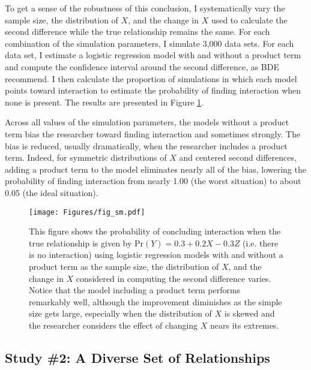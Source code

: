 \documentclass[12pt]{article}
\begin{document}
To get a sense of the robustness of this conclusion, I systematically vary the sample size, the distribution of $X$, and the change in $X$ used to calculate the second difference while the true relationship remains the same. For each combination of the simulation parameters, I simulate 3,000 data sets. For each data set, I estimate a logistic regression model with and without a product term and compute the confidence interval around the second difference, as BDE recommend. I then calculate the proportion of simulations in which each model points toward interaction to estimate the probability of finding interaction when none is present. The results are presented in Figure \ref{fig:sm}.

Across all values of the simulation parameters, the models without a product term bias the researcher toward finding interaction and sometimes strongly. The bias is reduced, usually dramatically, when the researcher includes a product term. Indeed, for symmetric distributions of $X$ and centered second differences, adding a product term to the model eliminates nearly all of the bias, lowering the probability of finding interaction
from nearly 1.00 (the worst  situation) to about 0.05 (the ideal situation).

\begin{figure}
\begin{center}
\texttt{[image: Figures/fig\_sm.pdf]}
\end{center}
\caption{This figure shows the probability of concluding interaction when the true relationship is given by $\text{Pr}(Y) = 0.3 + 0.2X - 0.3Z$ (i.e. there is no interaction) using logistic regression models with and without a product term as the sample size, the distribution of $X$, and the change in $X$ considered in computing the second difference varies. Notice that the model including a product term performs remarkably well, although the improvement diminishes as the simple size gets large, especially when the distribution of $X$ is skewed and the researcher considers the effect of changing $X$ nears its extremes.}\label{fig:sm}
\end{figure}

\subsection*{Study \#2: A Diverse Set of Relationships}
\end{document}
